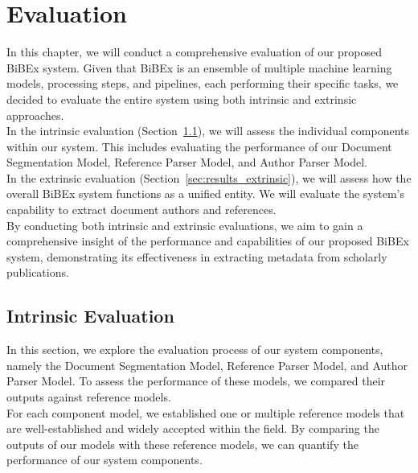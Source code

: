 \chapter{Evaluation}\label{chap:results}
In this chapter, we will conduct a comprehensive evaluation of our proposed BiBEx system. Given that BiBEx is an ensemble of multiple machine learning models, processing steps, and pipelines, each performing their specific tasks, we decided to evaluate the entire system using both intrinsic and extrinsic approaches.\\
In the intrinsic evaluation (Section~\ref{sec:results_intrinsic}), we will assess the individual components within our system. This includes evaluating the performance of our Document Segmentation Model, Reference Parser Model, and Author Parser Model.\\
In the extrinsic evaluation (Section~\ref{sec:results_extrinsic}), we will assess how the overall BiBEx system functions as a unified entity. We will evaluate the system's capability to extract document authors and references.\\
By conducting both intrinsic and extrinsic evaluations, we aim to gain a comprehensive insight of the performance and capabilities of our proposed BiBEx system, demonstrating its effectiveness in extracting metadata from scholarly publications.

\section{Intrinsic Evaluation}\label{sec:results_intrinsic}
In this section, we explore the evaluation process of our system components, namely the Document Segmentation Model, Reference Parser Model, and Author Parser Model. To assess the performance of these models, we compared their outputs against reference models.\\
For each component model, we established one or multiple reference models that are well-established and widely accepted within the field. By comparing the outputs of our models with these reference models, we can quantify the performance of our system components.


